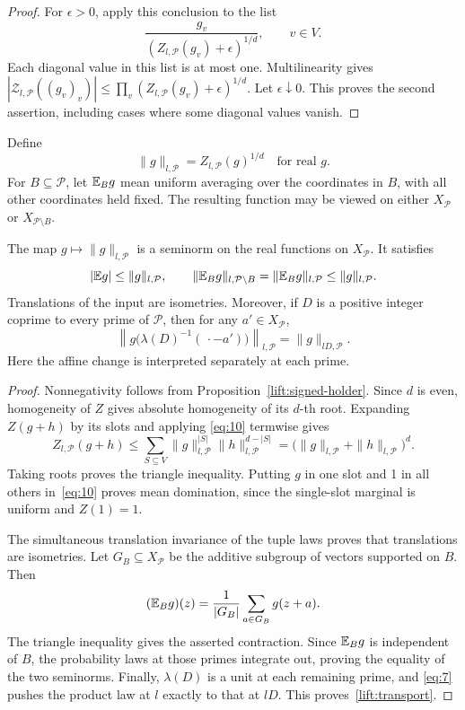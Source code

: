 \begin{proof}
For \(\epsilon>0\), apply this conclusion to the list
\[
 \frac{g_v}{(Z_{l,\mathcal P}(g_v)+\epsilon)^{1/d}},
 \qquad v\in V.
\]
Each diagonal value in this list is at most one.  Multilinearity gives
\( |\mathcal Z_{l,\mathcal P}((g_v)_v)|
 \le\prod_v(Z_{l,\mathcal P}(g_v)+\epsilon)^{1/d}\).
Let \(\epsilon\downarrow0\).  This proves the second assertion,
including cases where some diagonal values vanish.
\end{proof}

Define
\[
 \|g\|_{l,\mathcal P}=Z_{l,\mathcal P}(g)^{1/d}
 \quad\text{for real }g.
\]
For \(B\subseteq\mathcal P\), let \(\mathbb E_B g\) mean uniform averaging
over the coordinates in \(B\), with all other coordinates held fixed.
The resulting function may be viewed on either \(X_{\mathcal P}\) or
\(X_{\mathcal P\setminus B}\).

\begin{lemma}
\label{lift:seminorm}
The map \(g\mapsto\|g\|_{l,\mathcal P}\) is a seminorm on the real
functions on \(X_{\mathcal P}\).  It satisfies
\[
 |\mathbb E g|\le\|g\|_{l,\mathcal P},
 \qquad
 \|\mathbb E_Bg\|_{l,\mathcal P\setminus B}
 =\|\mathbb E_Bg\|_{l,\mathcal P}
 \le\|g\|_{l,\mathcal P}.
\]
Translations of the input are isometries.  Moreover, if \(D\) is a
positive integer coprime to every prime of \(\mathcal P\), then for
any \(a'\in X_{\mathcal P}\),
\begin{equation}
 \left\|g\bigl(\lambda(D)^{-1}(\,\cdot-a')\bigr)
       \right\|_{l,\mathcal P}
 =\|g\|_{lD,\mathcal P}.
 \label{lift:transport}
\end{equation}
Here the affine change is interpreted separately at each prime.
\end{lemma}

\begin{proof}
Nonnegativity follows from Proposition~\ref{lift:signed-holder}.
Since \(d\) is even, homogeneity of \(Z\) gives absolute homogeneity
of its \(d\)-th root.  Expanding \(Z(g+h)\) by its slots and applying
\eqref{eq:10} termwise gives
\[
 Z_{l,\mathcal P}(g+h)
 \le\sum_{S\subseteq V}\|g\|_{l,\mathcal P}^{|S|}
                         \|h\|_{l,\mathcal P}^{d-|S|}
 =\bigl(\|g\|_{l,\mathcal P}+\|h\|_{l,\mathcal P}\bigr)^d.
\]
Taking roots proves the triangle inequality.
Putting \(g\) in one slot and 1 in all others in~\eqref{eq:10}
proves mean domination, since the single-slot marginal is uniform and
\(Z(1)=1\).

The simultaneous translation invariance of the tuple laws proves that
translations are isometries.  Let \(G_B\subseteq X_{\mathcal P}\)
be the additive subgroup of vectors supported on \(B\).  Then
\[
 (\mathbb E_Bg)(z)=\frac1{|G_B|}\sum_{a\in G_B}g(z+a).
\]
The triangle inequality gives the asserted contraction.  Since
\(\mathbb E_Bg\) is independent of \(B\), the probability laws at those
primes integrate out, proving the equality of the two seminorms.
Finally, \(\lambda(D)\) is a unit at each remaining prime, and
\eqref{eq:7} pushes the product law at \(l\) exactly to that at
\(lD\).  This proves~\eqref{lift:transport}.
\end{proof}

